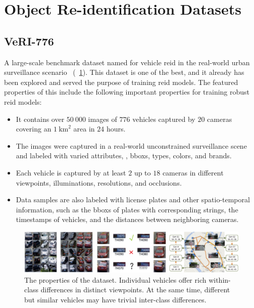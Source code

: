 \section{Object Re-identification Datasets}
\label{sec:ObjectReIDDatasets}

\subsection{VeRI-776}
\label{ssec:DatasetVeRI776}

A large-scale benchmark dataset named \verisss{} for vehicle \gls{reid} in the real-world urban surveillance scenario~\cite{liu2018provid} (\figtext{}~\ref{fig:VeRI776Dataset}). This dataset is one of the best, and it already has been explored and served the purpose of training \gls{reid} models. The featured properties of this include the following important properties for training robust \gls{reid} models:

\begin{itemize}
    \item It contains over $50\ 000$ images of $776$ vehicles captured by $20$ cameras covering an $1\  \text{km}^2$ area in $24$ hours.
    \item The images were captured in a real-world unconstrained surveillance scene and labeled with varied attributes, \egtext{}, \glspl{bbox}, types, colors, and brands.
    \item Each vehicle is captured by at least $2$ up to $18$ cameras in different viewpoints, illuminations, resolutions, and occlusions.
    \item Data samples are also labeled with license plates and other spatio-temporal information, such as the \glspl{bbox} of plates with corresponding strings, the timestamps of vehicles, and the distances between neighboring cameras.
\end{itemize}

\begin{figure}[t]
    \centerline{\includegraphics[width=\linewidth]{figures/datasets/veri776__overview.pdf}}
    \caption[\verisss{} dataset]{The properties of the \verisss{} dataset. Individual vehicles offer rich within-class differences in distinct viewpoints. At the same time, different but similar vehicles may have trivial inter-class differences. }
    \label{fig:VeRI776Dataset}
\end{figure}
